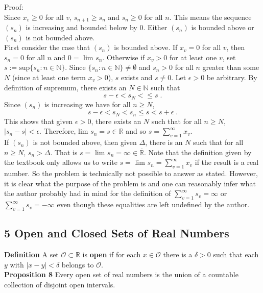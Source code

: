 \documentclass[a4paper]{article}
\begin{document}
Proof:\\

Since $x_v \geq 0$ for all $v$, $s_{n+1} \geq s_n$  and $s_n \geq 0$ for all $n$. This means the sequence $(s_n)$ is increasing and bounded below by 0. Either $(s_n)$ is bounded above or $(s_n)$ is not bounded above.\\

First consider the case that $(s_n)$ is bounded above. If $x_v = 0$ for all $v$, then $s_n = 0$ for all $n$ and $0 = $ lim $s_n$. Otherwise if $x_v >0$ for at least one $v$, set $s := \text{sup}\{s_n : n \in \mathbb{N}\}$. Since $\{s_n : n \in \mathbb{N}\} \neq \emptyset$ and $s_n > 0$ for all $n$ greater than some $N$ (since at least one term $x_v >0$), $s$ exists and $s \neq 0$. Let $\epsilon > 0$ be arbitrary. By definition of supremum, there exists an $N \in \mathbb{N}$ such that $$s - \epsilon < s_N <\leq s \;.$$
Since $(s_n)$ is increasing we have for all $n\geq N$,
$$ s-\epsilon < s_N < s_n \leq s < s+\epsilon \;.$$
This shows that given $\epsilon >0$, there exists an $N$ such that for all $n\geq N$, $|s_n - s| < \epsilon$. Therefore, lim $s_n = s \in \mathbb{R}$ and so $s = \sum_{v = 1}^\infty x_v$. \\

If $(s_n)$ is not bounded above, then given $\Delta$, there is an $N$ such that for all $n\geq N$, $s_n > \Delta$. That is $s = $ lim $s_n = \infty \in \overline{\mathbb{R}}$. Note that the definition given by the textbook only allows us to write $s = $ lim $s_n = \sum_{v=1}^\infty x_v$ if the result is a real number. So the problem is technically not possible to answer as stated. However, it is clear what the purpose of the problem is and one can reasonably infer what the author probably had in mind for the definition of $\sum_{v=1}^\infty s_v = \infty$ or $\sum_{v=1}^\infty s_v = -\infty$ even though these equalities are left undefined by the author. \\

\subsection*{5 Open and Closed Sets of Real Numbers}

{\bf Definition} A set $\mathcal{O} \subset \mathbb{R}$ is {\bf open} if for each $x \in \mathcal{O}$ there is a $\delta >0$ such that each $y$ with $|x-y|<\delta$ belongs to $\mathcal{O}$. \\

{\bf Proposition 8} Every open set of real numbers is the union of a countable collection of disjoint open intervals. \\
\end{document}
